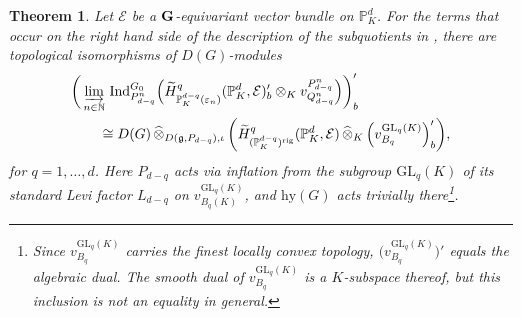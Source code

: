 \documentclass[a4paper, reqno, 10pt]{amsart}
\newtheorem{theorem}{Theorem}[subsection]
\theoremstyle{definition}
\numberwithin{equation}{section}
\newcommand{\cotimes}[1]{{\,\widehat{\otimes}_{#1}\,}}
\newcommand{\GL}{{\mathrm{GL}}}
\newcommand{\hy}{{\mathrm{hy}}}
\newcommand{\Ind}{{\mathrm{Ind}}}
\newcommand{\rig}{{\mathrm{rig}}}
\newcommand{\BN}{{\mathbb {N}}}
\newcommand{\BP}{{\mathbb {P}}}
\newcommand{\CE}{{\mathcal {E}}}
\newcommand{\bG}{{\mathrm{\bf G}}}
\newcommand{\Fg}{{\mathfrak {g}}}
\begin{document}
\begin{theorem}\label{Thm 3 - Main theorem}
	Let $\CE$ be a $\bG$-equivariant vector bundle on $\BP_K^d$. 
	For the terms that occur on the right hand side of the description of the subquotients in , there are topological isomorphisms of $D(G)$-modules
	\begin{align*}
		&\bigg( \varinjlim_{n\in\BN}\, \Ind^{G_0}_{P^n_{d-q}} \Big( \widetilde{H}^{q}_{\BP_K^{d-q}(\varepsilon_n)} (\BP_K^d, \CE)'_b \otimes_K v^{P^n_{d-q}}_{Q^n_{d-q}} \Big) \bigg)'_b \\
		&\qquad\cong D(G) \cotimes{D(\Fg,P_{d-q}),\iota} \bigg( \widetilde{H}^{q}_{(\BP_K^{d-q})^\rig} (\BP_K^d, \CE) \cotimes{K} \Big( v^{\GL_{q}(K)}_{B_{q}} \Big)'_b \bigg) ,
	\end{align*}
	for $q=1,\ldots,d$.
	Here $P_{d-q}$ acts via inflation from the subgroup $\GL_q(K)$ of its standard Levi factor $L_{d-q}$ on $v^{\GL_{q}(K)}_{B_{q}(K)}$, and $\hy(G)$ acts trivially there\footnote{Since $v^{\GL_{q}(K)}_{B_{q}}$ carries the finest locally convex topology, $\Big( v^{\GL_{q}(K)}_{B_{q}} \Big)'$ equals the algebraic dual. The smooth dual of $v^{\GL_{q}(K)}_{B_{q}}$ is a $K$-subspace thereof, but this inclusion is not an equality in general.}.
\end{theorem}
\end{document}
